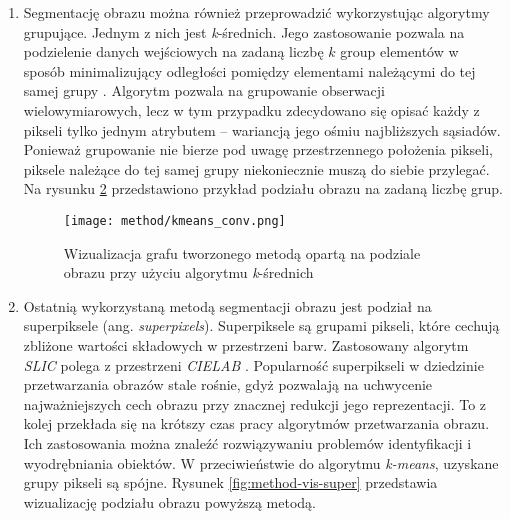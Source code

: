 {{{\begin{enumerate}
                \begin{figure}
                    \centering
                    \texttt{[image: method/window\_conv.png]}
                    \caption{Wizualizacja grafu tworzonego metodą opartą na podziale obrazu na nienachodzące prostokąty}
                    \label{fig:method-vis-window}
                \end{figure}

                \item Segmentację obrazu można również przeprowadzić wykorzystując algorytmy grupujące. Jednym z nich
                jest \textit{k}-średnich. Jego zastosowanie pozwala na podzielenie danych wejściowych na zadaną liczbę
                $k$ group elementów w sposób minimalizujący odległości pomiędzy elementami należącymi do tej samej grupy
                \cite{MacQueen1967SomeMF}. Algorytm pozwala na grupowanie obserwacji wielowymiarowych, lecz w tym
                przypadku zdecydowano się opisać każdy z pikseli tylko jednym atrybutem -- wariancją jego ośmiu
                najbliższych sąsiadów. Ponieważ grupowanie nie bierze pod uwagę przestrzennego położenia pikseli,
                piksele należące do tej samej grupy niekoniecznie muszą do siebie przylegać. Na rysunku
                \ref{fig:method-vis-kmeans} przedstawiono przykład podziału obrazu na zadaną liczbę grup.

                \begin{figure}
                    \centering
                    \texttt{[image: method/kmeans\_conv.png]}
                    \caption{Wizualizacja grafu tworzonego metodą opartą na podziale obrazu przy użyciu algorytmu \textit{k}-średnich}
                    \label{fig:method-vis-kmeans}
                \end{figure}

                \item Ostatnią wykorzystaną metodą segmentacji obrazu jest podział na superpiksele (ang.
                \textit{superpixels}). Superpiksele są grupami pikseli, które cechują zbliżone wartości składowych w
                przestrzeni barw. Zastosowany algorytm \textit{SLIC} polega z przestrzeni
                \textit{CIELAB} \cite{Achanta2012SLICSC}. Popularność superpikseli w dziedzinie przetwarzania obrazów
                stale rośnie, gdyż pozwalają na uchwycenie najważniejszych cech obrazu przy znacznej redukcji jego
                reprezentacji. To z kolej przekłada się na krótszy czas pracy algorytmów przetwarzania obrazu. Ich
                zastosowania można znaleźć rozwiązywaniu problemów identyfikacji i wyodrębniania obiektów. W
                przeciwieństwie do algorytmu \textit{k-means}, uzyskane grupy pikseli są spójne. Rysunek
                \ref{fig:method-vis-super} przedstawia wizualizację podziału obrazu powyższą metodą.


\end{enumerate}}}}
